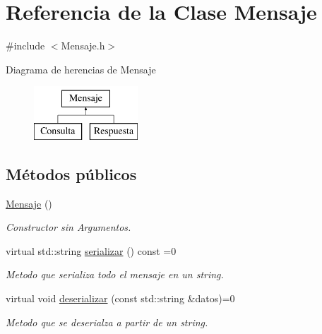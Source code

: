 \hypertarget{classMensaje}{\section{\-Referencia de la \-Clase \-Mensaje}
\label{classMensaje}
}


{\ttfamily \#include $<$\-Mensaje.\-h$>$}

\-Diagrama de herencias de \-Mensaje\begin{figure}[H]
\begin{center}
\leavevmode
\includegraphics[height=2.000000cm]{classMensaje}
\end{center}
\end{figure}
\subsection*{\-Métodos públicos}
\begin{DoxyCompactItemize}
\item 
\hypertarget{classMensaje_a7b8b4ca08f400fef32eaffeec00f65b3}{\hyperlink{classMensaje_a7b8b4ca08f400fef32eaffeec00f65b3}{\-Mensaje} ()}\label{classMensaje_a7b8b4ca08f400fef32eaffeec00f65b3}

\begin{DoxyCompactList}\small\item\em \-Constructor sin \-Argumentos. \end{DoxyCompactList}\item 
virtual std\-::string \hyperlink{classMensaje_afd69cd129ca7ce1cf967a6f3690ad904}{serializar} () const =0
\begin{DoxyCompactList}\small\item\em \-Metodo que serializa todo el mensaje en un string. \end{DoxyCompactList}\item 
virtual void \hyperlink{classMensaje_a49422c2abf7fe32e887ee854cdf6cf25}{deserializar} (const std\-::string \&datos)=0
\begin{DoxyCompactList}\small\item\em \-Metodo que se deserialza a partir de un string. \end{DoxyCompactList}\end{DoxyCompactItemize}


